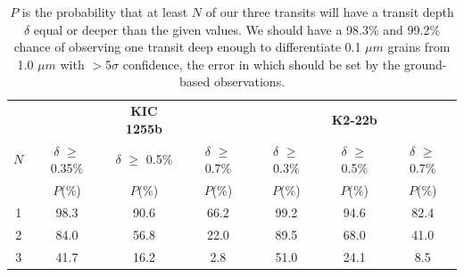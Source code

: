 \documentclass[letterpaper,12pt]{article}
\begin{document}
\begin{table}[b]
\centering
\begin{tabular}{|c | c c c| c c c|} 
\hline\hline 

	   	&     				& {\bf KIC 1255b}		&				&				& {\bf K2-22b}		&		  		\\
  $N$   	&    $\delta$ $\ge$ 0.35\%	& $\delta$ $\ge$ 0.5\%		& $\delta$ $\ge$ 0.7\%		& $\delta$ $\ge$ 0.3\%		& $\delta$ $\ge$ 0.5\%		& $\delta$ $\ge$ 0.7\%		\\
 	   	&    $P$(\%)              & $P$(\%)				& $P$(\%) 		& $P$(\%)			& $P$(\%) 		& $P$(\%)			\\
\hline 
\hline
	1	&	98.3			& 90.6 				& 66.2			& 99.2			& 94.6			& 82.4	\\
	2	& 	84.0			& 56.8				& 22.0			& 89.5			& 68.0			& 41.0	\\
	3	& 	41.7			& 16.2				& 2.8				& 51.0			& 24.1			& 8.5		\\

\hline 
\end{tabular}
\caption{$P$ is the probability that at least $N$ of our three
transits will have a transit depth $\delta$ equal or deeper than the given values. We should have a 98.3\% and 99.2\% chance of observing one transit deep enough to 
differentiate 0.1 $\mu m$ grains from 1.0 $\mu m$ with $>$5$\sigma$ confidence, the error in which should be set by the ground-based observations.}
\label{tab:probabilities}
\end{table}





\begingroup
\renewcommand{\section}[2]{}%

\endgroup
\end{document}
